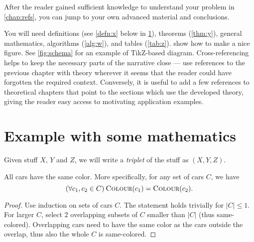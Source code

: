 After the reader gained sufficient knowledge to understand your problem in \cref{chap:refs}, you can jump to your own advanced material and conclusions.

You will need definitions (see \cref{defn:x} below in \cref{sec:demo}), theorems (\cref{thm:y}), general mathematics, algorithms (\cref{alg:w}), and tables (\cref{tab:z}).  show how to make a nice figure. See \cref{fig:schema} for an example of TikZ-based diagram. Cross-referencing helps to keep the necessary parts of the narrative close --- use references to the previous chapter with theory wherever it seems that the reader could have forgotten the required context. Conversely, it is useful to add a few references to theoretical chapters that point to the sections which use the developed theory, giving the reader easy access to motivating application examples.

\section{Example with some mathematics}
\label{sec:demo}

\begin{defn}[Triplet]\label{defn:x}
Given stuff $X$, $Y$ and $Z$, we will write a \emph{triplet} of the stuff as $(X,Y,Z)$.
\end{defn}

\newcommand{\Col}{\textsc{Colour}}

\begin{thm}\label{thm:y}
All cars have the same color. More specifically, for any set of cars $C$, we have
$$(\forall c_1, c_2 \in C)\:\Col(c_1) = \Col(c_2).$$
\end{thm}

\begin{proof}
Use induction on sets of cars $C$. The statement holds trivially for $|C|\leq1$. For larger $C$, select 2 overlapping subsets of $C$ smaller than $|C|$ (thus same-colored). Overlapping cars need to have the same color as the cars outside the overlap, thus also the whole $C$ is same-colored.
\end{proof}

